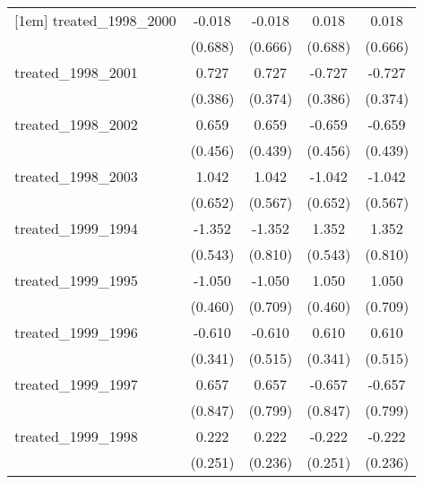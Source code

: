 {\begin{tabular}{l*{4}{c}}
[1em]
treated\_1998\_2000&      -0.018         &      -0.018         &       0.018         &       0.018         \\
            &     (0.688)         &     (0.666)         &     (0.688)         &     (0.666)         \\
[1em]
treated\_1998\_2001&       0.727         &       0.727         &      -0.727         &      -0.727         \\
            &     (0.386)         &     (0.374)         &     (0.386)         &     (0.374)         \\
[1em]
treated\_1998\_2002&       0.659         &       0.659         &      -0.659         &      -0.659         \\
            &     (0.456)         &     (0.439)         &     (0.456)         &     (0.439)         \\
[1em]
treated\_1998\_2003&       1.042         &       1.042         &      -1.042         &      -1.042         \\
            &     (0.652)         &     (0.567)         &     (0.652)         &     (0.567)         \\
[1em]
treated\_1999\_1994&      -1.352\sym{*}  &      -1.352         &       1.352\sym{*}  &       1.352         \\
            &     (0.543)         &     (0.810)         &     (0.543)         &     (0.810)         \\
[1em]
treated\_1999\_1995&      -1.050\sym{*}  &      -1.050         &       1.050\sym{*}  &       1.050         \\
            &     (0.460)         &     (0.709)         &     (0.460)         &     (0.709)         \\
[1em]
treated\_1999\_1996&      -0.610         &      -0.610         &       0.610         &       0.610         \\
            &     (0.341)         &     (0.515)         &     (0.341)         &     (0.515)         \\
[1em]
treated\_1999\_1997&       0.657         &       0.657         &      -0.657         &      -0.657         \\
            &     (0.847)         &     (0.799)         &     (0.847)         &     (0.799)         \\
[1em]
treated\_1999\_1998&       0.222         &       0.222         &      -0.222         &      -0.222         \\
            &     (0.251)         &     (0.236)         &     (0.251)         &     (0.236)         \\

\end{tabular}}
